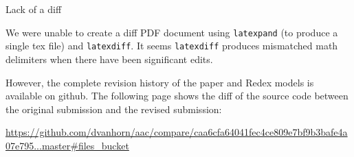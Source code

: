 \begin{titlepage}
%

\newpage
  \begin{center}
    \Large{Lack of a diff}
  \end{center}

We were unable to create a diff PDF document using \texttt{latexpand}
(to produce a single tex file) and \texttt{latexdiff}.  It seems
\texttt{latexdiff} produces mismatched math delimiters when there have
been significant edits.

However, the complete revision history of the paper and Redex models
is available on github.  The following page shows the diff of the
source code between the original submission and the revised
submission:


\begin{center}
\url{https://github.com/dvanhorn/aac/compare/caa6cfa64041fec4ce809e7bf9b3bafe4a07e795...master#files_bucket}
\end{center}

\end{titlepage}
